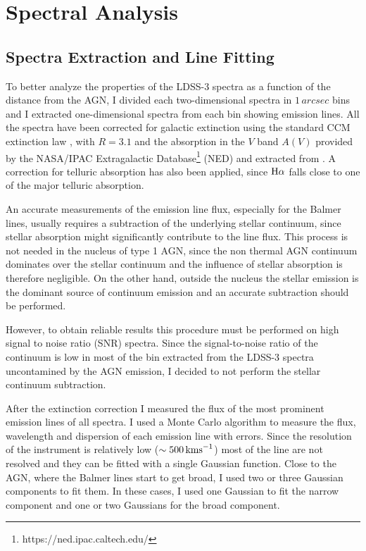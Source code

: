 \documentclass[../main.tex]{subfiles}
\begin{document}
\section{Spectral Analysis}
\label{sec:spectral_anal}

\subsection{Spectra Extraction and Line Fitting}
\label{sec:extraction}
To better analyze the properties of the LDSS-3 spectra as a function of the distance from the AGN, I divided each two-dimensional spectra in $1\,\si{arcsec}$ bins and I extracted one-dimensional spectra from each bin showing emission lines.
All the spectra have been corrected for galactic extinction using the standard CCM extinction law \citep{Cardelli89}, with $R = 3.1$ and the absorption in the $V$ band $A(V)$ provided by the NASA/IPAC Extragalactic Database\footnote{https://ned.ipac.caltech.edu/} (NED) and extracted from \citet{Schlafly11}.
A correction for telluric absorption has also been applied, since $\Ha$ falls close to one of the major telluric absorption.

An accurate measurements of the emission line flux, especially for the Balmer lines, usually requires a subtraction of the underlying stellar continuum, since stellar absorption might significantly contribute to the line flux.
This process is not needed in the nucleus of type 1 AGN, since the non thermal AGN continuum dominates over the stellar continuum and the influence of stellar absorption is therefore negligible.
On the other hand, outside the nucleus the stellar emission is the dominant source of continuum emission and an accurate subtraction should be performed.

However, to obtain reliable results this procedure must be performed on high signal to noise ratio (SNR) spectra.
Since the signal-to-noise ratio of the continuum is low in most of the bin extracted from the LDSS-3 spectra uncontamined by the AGN emission, I decided to not perform the stellar continuum subtraction.

After the extinction correction I measured the flux of the most prominent emission lines of all spectra.
I used a Monte Carlo algorithm to measure the flux, wavelength and dispersion of each emission line with errors.
Since the resolution of the instrument is relatively low ($\sim 500\,\si{\kms}$) most of the line are not resolved and they can be fitted with a single Gaussian function.
Close to the AGN, where the Balmer lines start to get broad, I used two or three Gaussian components to fit them.
In these cases, I used one Gaussian to fit the narrow component and one or two Gaussians for the broad component.
\end{document}

